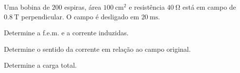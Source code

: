\begin{questao}[2]{}

Uma bobina de $200$ espiras, área $\SI{100}{\centi\meter\squared}$ e
resistência $\SI{40}{\ohm}$ está em campo de $\SI{0.8}{\tesla}$
perpendicular. O campo é desligado em $\SI{20}{\milli\second}$.
\begin{itensq}
\item Determine a f.e.m. e a corrente induzidas.
\item Determine o sentido da corrente em relação ao campo original.
\item Determine a carga total.
\end{itensq}


\end{questao}

